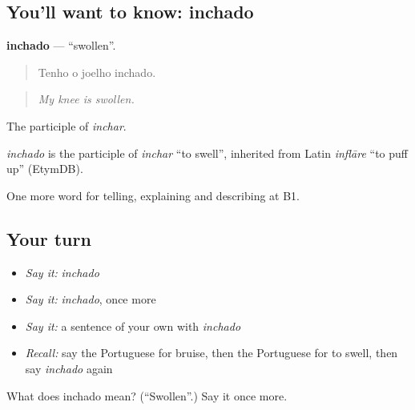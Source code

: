 \subsection*{You'll want to know: inchado}
\textbf{inchado} — \textquotedblleft{}swollen\textquotedblright{}.

\begin{quote}
Tenho o joelho inchado.
\end{quote}

\begin{quote}
\emph{My knee is swollen.}
\end{quote}

The participle of \emph{inchar}.

\begin{cousinweb}
\emph{inchado} is the participle of \emph{inchar} \textquotedblleft{}to swell\textquotedblright{}, inherited from Latin \emph{inflāre} \textquotedblleft{}to puff up\textquotedblright{} (EtymDB).
\end{cousinweb}

\begin{grammarlens}[title={What you've built}]
One more word for telling, explaining and describing at B1.
\end{grammarlens}

\subsection*{Your turn}
\begin{itemize}
\raggedright
  \item \emph{Say it:} \emph{inchado}
  \item \emph{Say it:} \emph{inchado}, once more
  \item \emph{Say it:} a sentence of your own with \emph{inchado}
  \item \emph{Recall:} say the Portuguese for bruise, then the Portuguese for to swell, then say \emph{inchado} again
\end{itemize}

\begin{tcolorbox}[breakable,colback=teal!4,colframe=teal!35!black,title={Before you move on}]
What does inchado mean? (\textquotedblleft{}Swollen\textquotedblright{}.) Say it once more.
\end{tcolorbox}
